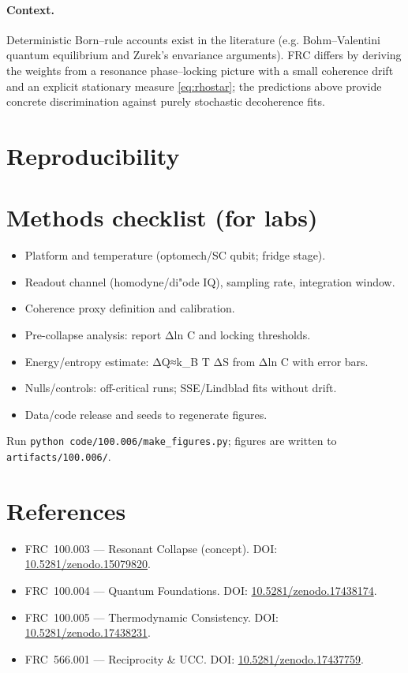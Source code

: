 \documentclass[10pt]{article}
\begin{document}
\paragraph{Context.} Deterministic Born--rule accounts exist in the literature (e.g. Bohm--Valentini quantum equilibrium and Zurek's envariance arguments). FRC differs by deriving the weights from a resonance phase--locking picture with a small coherence drift and an explicit stationary measure \eqref{eq:rhostar}; the predictions above provide concrete discrimination against purely stochastic decoherence fits.

\section*{Reproducibility}
\section*{Methods checklist (for labs)}
\small\begin{itemize}
\item Platform and temperature (optomech/SC qubit; fridge stage).\n\item Readout channel (homodyne/di"ode IQ), sampling rate, integration window.\n\item Coherence proxy definition and calibration.\n\item Pre-collapse analysis: report Δln C and locking thresholds.\n\item Energy/entropy estimate: ΔQ≈k_B T ΔS from Δln C with error bars.\n\item Nulls/controls: off-critical runs; SSE/Lindblad fits without drift.\n\item Data/code release and seeds to regenerate figures.\n\end{itemize}
Run \verb|python code/100.006/make_figures.py|; figures are written to \verb|artifacts/100.006/|.

\section*{References}
\small
\begin{itemize}
  \item FRC~100.003 — Resonant Collapse (concept). DOI: \href{https://doi.org/10.5281/zenodo.15079820}{10.5281/zenodo.15079820}.
  \item FRC~100.004 — Quantum Foundations. DOI: \href{https://doi.org/10.5281/zenodo.17438174}{10.5281/zenodo.17438174}.
  \item FRC~100.005 — Thermodynamic Consistency. DOI: \href{https://doi.org/10.5281/zenodo.17438231}{10.5281/zenodo.17438231}.
  \item FRC~566.001 — Reciprocity \& UCC. DOI: \href{https://doi.org/10.5281/zenodo.17437759}{10.5281/zenodo.17437759}.
\end{itemize}
\end{document}
